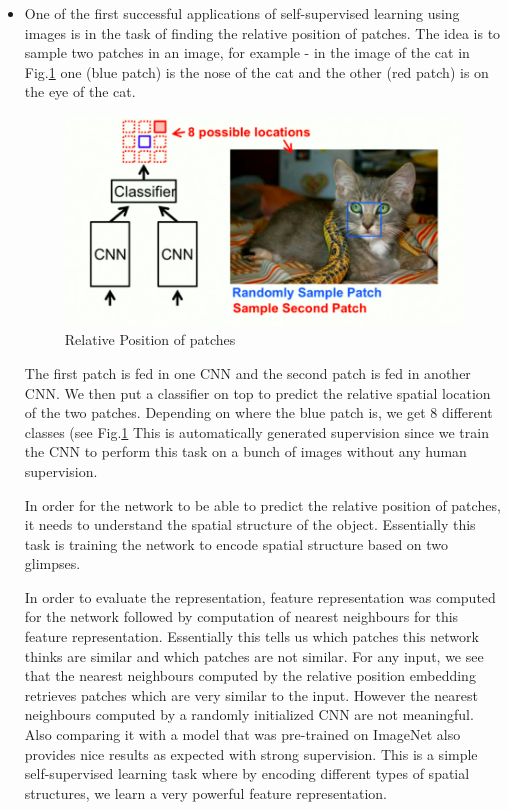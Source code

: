 \begin{itemize}
    
\item One of the first successful applications of self-supervised learning using images is in the task of finding the relative position of patches. The idea is to sample two patches in an image, for example - in the image of the cat in Fig.\ref{fig:1} one (blue patch) is the nose of the cat and the other (red patch) is on the eye of the cat. 

\begin{figure}[h!]
  \includegraphics[width=\linewidth]{lectures/13/RelativePosition.jpg}
  \caption{Relative Position of patches}
  \label{fig:1}
\end{figure}

The first patch is fed in one CNN and the second patch is fed in another CNN. We then put a classifier on top to predict the relative spatial location of the two patches. Depending on where the blue patch is, we get 8 different classes (see Fig.\ref{fig:1} This is automatically generated supervision since we train the CNN to perform this task on a bunch of images without any human supervision.

In order for the network to be able to predict the relative position of patches, it needs to understand the spatial structure of the object. Essentially this task is training the network to encode spatial structure based on two glimpses.

In order to evaluate the representation, feature representation was computed for the network followed by computation of nearest neighbours for this feature representation. Essentially this tells us which patches this network thinks are similar and which patches are not similar. For any input, we see that the nearest neighbours computed by the relative position embedding retrieves patches which are very similar to the input. However the nearest neighbours computed by a randomly initialized CNN are not meaningful. Also comparing it with a model that was pre-trained on ImageNet also provides nice results as expected with strong supervision. This is a simple self-supervised learning task where by encoding different types of spatial structures, we learn a very powerful feature representation.


\end{itemize}
